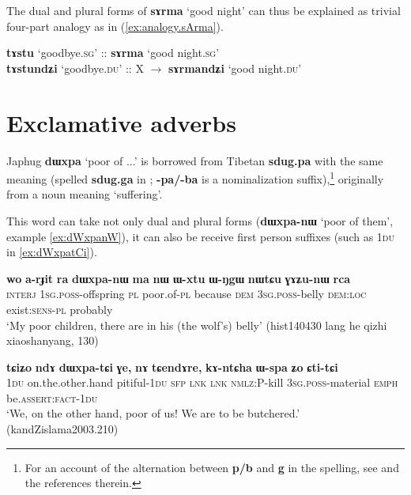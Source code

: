 \documentclass[11pt]{article}
\newcommand{\ipa}[1]{{\phon\textbf{#1}}}
\newcommand{\refb}[1]{(\ref{#1})}
\begin{document}
The dual and plural forms of \ipa{sɤrma} `good night' can thus be explained as trivial four-part analogy as in \refb{ex:analogy.sArma}.

\begin{exe}
\ex \label{ex:analogy.sArma}
\gll
\ipa{tɤstu} `goodbye.\textsc{sg}' :: {\ipa{sɤrma} `good night.\textsc{sg}'} \\
\ipa{tɤstundʑi} `goodbye.\textsc{du}' :: {X $\rightarrow$ \ipa{sɤrmandʑi} `good night.\textsc{du}'} \\
\end{exe}

\section{Exclamative adverbs}
Japhug \ipa{dɯxpa} `poor of ...' is borrowed from Tibetan \ipa{sdug.pa} with the same meaning (spelled \ipa{sdug.ga} in \citealt{bodrgya}; \ipa{-pa/-ba} is a nominalization suffix),\footnote{For an account of the alternation between \ipa{p/b} and \ipa{g} in the spelling, see \citet{hill11hb} and the references therein.} originally from a noun meaning `suffering'.

This word can take not only dual and plural forms (\ipa{dɯxpa-nɯ} `poor of them', example \ref{ex:dWxpanW}), it can also be receive first person suffixes (such as \textsc{1du} in \ref{ex:dWxpatCi}).

\begin{exe}
\ex \label{ex:dWxpanW}
\gll
\ipa{wo} 	\ipa{a-rɟit} 	\ipa{ra} 	\ipa{dɯxpa-nɯ} 	\ipa{ma} 	\ipa{nɯ} 	\ipa{ɯ-xtu} 	\ipa{ɯ-ŋgɯ} 	\ipa{nɯtɕu} 	\ipa{ɣɤʑu-nɯ} 	\ipa{rca}  \\
\textsc{interj} \textsc{1sg.poss}-offspring \textsc{pl} poor.of-\textsc{pl} because \textsc{dem} \textsc{3sg.poss}-belly  \textsc{dem:loc}  exist:\textsc{sens-pl} probably \\
\glt `My poor children, there are in his (the wolf's) belly' (hist140430 lang he qizhi xiaoshanyang, 130)
\end{exe}

\begin{exe}
\ex \label{ex:dWxpatCi}
\gll
\ipa{tɕiʑo} 	\ipa{ndɤ} 	\ipa{dɯxpa-tɕi} 	\ipa{ɣe,} 	\ipa{nɤ} 	\ipa{tɕendɤre,} 	\ipa{kɤ-ntɕha} 	\ipa{ɯ-spa} 	\ipa{ʑo} 	\ipa{ɕti-tɕi}  \\
\textsc{1du} on.the.other.hand pitiful-\textsc{1du} \textsc{sfp} \textsc{lnk} \textsc{lnk} \textsc{nmlz}:P-kill \textsc{3sg.poss}-material \textsc{emph} be.\textsc{assert:fact-1du} \\
\glt `We, on the other hand, poor of us! We are to be butchered.' (kandZislama2003.210)
\end{exe}
\end{document}
